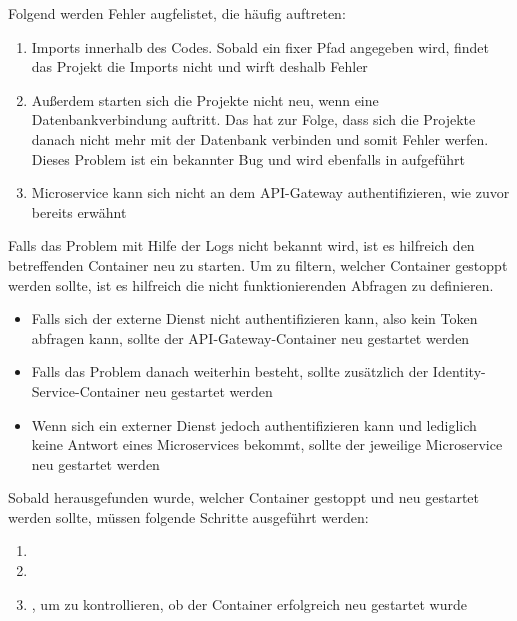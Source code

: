 Folgend werden Fehler augfelistet, die häufig auftreten:
\begin{enumerate}
	\item Imports innerhalb des Codes. Sobald ein fixer Pfad angegeben wird, findet das Projekt die Imports nicht und wirft deshalb Fehler
	\item Außerdem starten sich die Projekte nicht neu, wenn eine Datenbankverbindung auftritt. Das hat zur Folge, dass sich die Projekte danach nicht mehr mit der Datenbank verbinden und somit Fehler werfen. Dieses Problem ist ein bekannter Bug und wird ebenfalls in   aufgeführt
	\item Microservice kann sich nicht an dem API-Gateway authentifizieren, wie zuvor bereits erwähnt
\end{enumerate}
Falls das Problem mit Hilfe der Logs nicht bekannt wird, ist es hilfreich den betreffenden Container neu zu starten. Um zu filtern, welcher Container gestoppt werden sollte, ist es hilfreich die nicht funktionierenden Abfragen zu definieren. 
\begin{itemize}
	\item Falls sich der externe Dienst nicht authentifizieren kann, also kein Token abfragen kann, sollte der API-Gateway-Container neu gestartet werden
	\item  Falls das Problem danach weiterhin besteht, sollte zusätzlich der Identity-Service-Container neu gestartet werden
	\item  Wenn sich ein externer Dienst jedoch authentifizieren kann und lediglich keine Antwort eines Microservices bekommt, sollte der jeweilige Microservice neu gestartet werden
\end{itemize}
Sobald herausgefunden wurde, welcher Container gestoppt und neu gestartet werden sollte, müssen folgende Schritte ausgeführt werden: 
\begin{enumerate}
	\item {}
	\item {}
	\item {}, um zu kontrollieren, ob der Container erfolgreich neu gestartet wurde
\end{enumerate}

